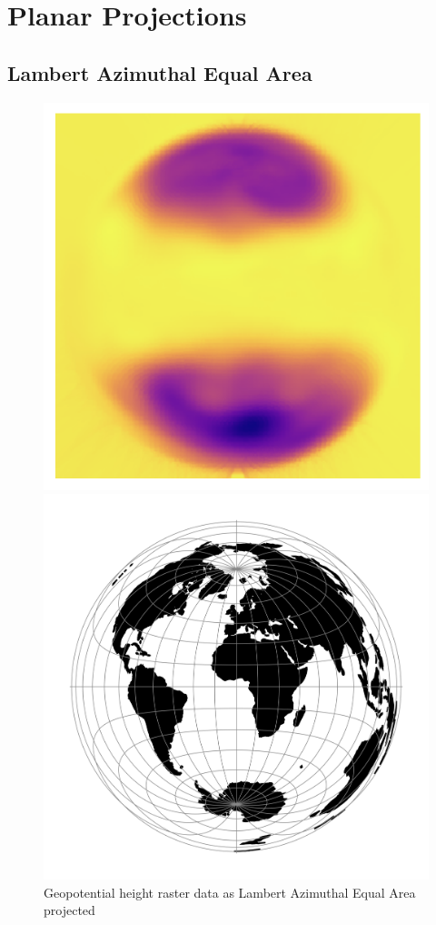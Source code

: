 
\section{Planar Projections}

\subsection{Lambert Azimuthal Equal Area}
\begin{figure}[H]
    \centering
    \begin{minipage}{0.30\textwidth}
        \centering
        \includegraphics[width=0.9\linewidth]{figures/chapter-8/geopoth_laea.png}
        \caption{ Geopotential height raster data as Lambert Azimuthal Equal Area projected}
        \label{fig:laea_geopoth_raster}
    \end{minipage}\hfill
    \begin{minipage}{0.30\textwidth}
        \centering
        \includegraphics[width=0.9\linewidth]{figures/chapter-8/laea.png}

\end{minipage}
\end{figure}
